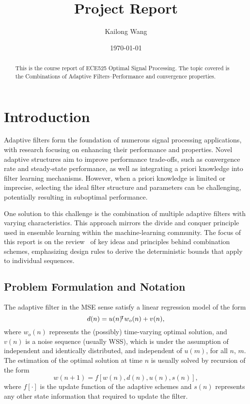 \documentclass[11pt]{article}
\title{Project Report}
\author{Kailong Wang}
\date{\today}
\begin{document}
\maketitle

\begin{abstract}
This is the course report of ECE525 Optimal Signal Processing. The topic covered is the Combinations of Adaptive Filters--Performance and convergence properties.
\end{abstract}

\section{Introduction}
Adaptive filters form the foundation of numerous signal processing applications, with research focusing on enhancing their performance and properties.
Novel adaptive structures aim to improve performance trade-offs, such as convergence rate and steady-state performance, as well as integrating a priori knowledge into filter learning mechanisms.
However, when a priori knowledge is limited or imprecise, selecting the ideal filter structure and parameters can be challenging, potentially resulting in suboptimal performance.

One solution to this challenge is the combination of multiple adaptive filters with varying characteristics.
This approach mirrors the divide and conquer principle used in ensemble learning within the machine-learning community.
The focus of this report is on the review~\cite{Arenas_Garcia_2016} of key ideas and principles behind combination schemes, emphasizing design rules to derive the deterministic bounds that apply to individual sequences.

\subsection{Problem Formulation and Notation}
The adaptive filter in the MSE sense satisfy a linear regression model of the form
\begin{equation}
    d(n) = u(n){}^{\mkern-4mu\intercal} w_o(n)+v(n),
\end{equation}
where $w_o(n)$ represents the (possibly) time-varying optimal solution, and $v(n)$ is a noise sequence (usually WSS), which is under the assumption of independent and identically distributed, and independent of $u(m)$, for all $n$, $m$.
The estimation of the optimal solution at time $n$ is usually solved by recursion of the form\begin{equation}
    w(n+1)=f[w(n), d(n), u(n), s(n)],
\end{equation}
where $f[\cdot]$ is the update function of the adaptive schemes and $s(n)$ represents any other state information that required to update the filter.
\end{document}
